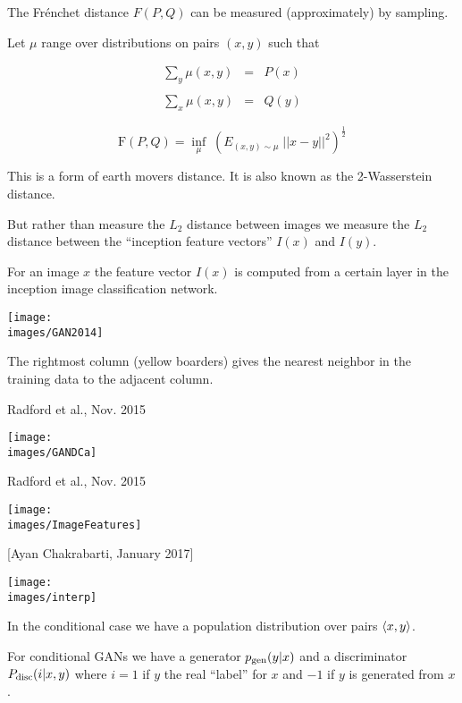 {

The Fr\'{e}nchet distance $F(P,Q)$ can be measured (approximately) by sampling.

\vfill
Let $\mu$ range over distributions on pairs $(x,y)$ such that

\begin{eqnarray*}
\sum_y \mu(x,y) & = & P(x) \\
\\
\sum_x \mu(x,y) & = & Q(y)
\end{eqnarray*}

$$\mathrm{F}(P,Q) = \inf_{\mu}\;\left(E_{(x,y)\sim \mu} \;||x-y||^2\right)^{\frac{1}{2}}$$

\vfill
This is a form of earth movers distance.  It is also known as the 2-Wasserstein distance.


But rather than measure the $L_2$ distance between images we measure the $L_2$ distance between
the ``inception feature vectors'' $I(x)$ and $I(y)$.

\vfill
For an image $x$ the feature vector $I(x)$ is computed from a certain layer in the inception image classification network.

\centerline{\texttt{[image: \\images/GAN2014]}}
The rightmost column (yellow boarders) gives the nearest neighbor in the training data to the adjacent column.

{Radford et al., Nov. 2015}

\centerline{\texttt{[image: \\images/GANDCa]}}

{Radford et al., Nov. 2015}

\centerline{\texttt{[image: \\images/ImageFeatures]}}


[Ayan Chakrabarti, January 2017]

\centerline{\texttt{[image: \\images/interp]}}

In the conditional case we have a population distribution over pairs ${\mbox{$\langle x,y\rangle$}}$.

\vfill
For conditional GANs we have a generator $p_{\mathrm{gen}}(y|x)$ and a discriminator $P_{\mathrm{disc}}(i|x,y)$
where $i = 1$ if $y$ the real ``label'' for $x$ and $-1$ if $y$ is generated from $x$.

}
